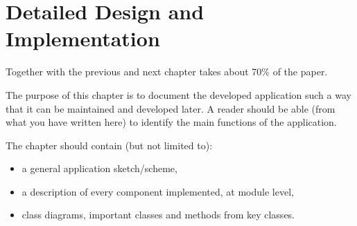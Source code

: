 \chapter{Detailed Design and Implementation}
\pagestyle{fancy}

{\color{blue}Together with the previous and next chapter takes about 70\% of the paper.\\}


The purpose of this chapter is to document the developed application such a way that it
can be maintained and developed later. A reader should be able (from what you have written
here) to identify the main functions of the application.

The chapter should contain (but not limited to):
\begin{itemize}
	\item  a general application sketch/scheme,
    \item  a description of every component implemented, at module level,
    \item  class diagrams, important classes and methods from key classes.
\end{itemize}

